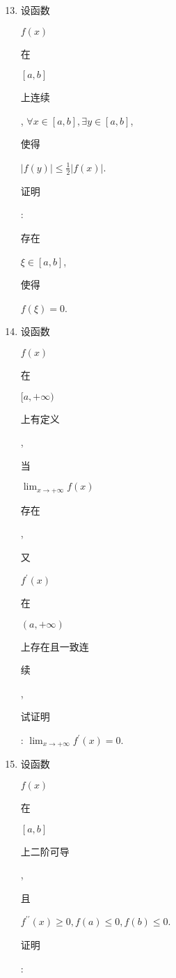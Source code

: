 \documentclass[10pt]{article}
\begin{document}
\begin{enumerate}
  \setcounter{enumi}{12}
  \item \begin{CJK}{UTF8}{mj}设函数\end{CJK} $f(x)$ \begin{CJK}{UTF8}{mj}在\end{CJK} $[a, b]$ \begin{CJK}{UTF8}{mj}上连续\end{CJK}, $\forall x \in[a, b], \exists y \in[a, b]$, \begin{CJK}{UTF8}{mj}使得\end{CJK} $|f(y)| \leqslant \frac{1}{2}|f(x)|$. \begin{CJK}{UTF8}{mj}证明\end{CJK}: \begin{CJK}{UTF8}{mj}存在\end{CJK} $\xi \in[a, b]$, \begin{CJK}{UTF8}{mj}使得\end{CJK} $f(\xi)=0$.

  \item \begin{CJK}{UTF8}{mj}设函数\end{CJK} $f(x)$ \begin{CJK}{UTF8}{mj}在\end{CJK} $[a,+\infty)$ \begin{CJK}{UTF8}{mj}上有定义\end{CJK}, \begin{CJK}{UTF8}{mj}当\end{CJK} $\lim _{x \rightarrow+\infty} f(x)$ \begin{CJK}{UTF8}{mj}存在\end{CJK}, \begin{CJK}{UTF8}{mj}又\end{CJK} $f^{\prime}(x)$ \begin{CJK}{UTF8}{mj}在\end{CJK} $(a,+\infty)$ \begin{CJK}{UTF8}{mj}上存在且一致连\end{CJK} \begin{CJK}{UTF8}{mj}续\end{CJK}, \begin{CJK}{UTF8}{mj}试证明\end{CJK}: $\lim _{x \rightarrow+\infty} f^{\prime}(x)=0$.

  \item \begin{CJK}{UTF8}{mj}设函数\end{CJK} $f(x)$ \begin{CJK}{UTF8}{mj}在\end{CJK} $[a, b]$ \begin{CJK}{UTF8}{mj}上二阶可导\end{CJK}, \begin{CJK}{UTF8}{mj}且\end{CJK} $f^{\prime \prime}(x) \geqslant 0, f(a) \leqslant 0, f(b) \leqslant 0$. \begin{CJK}{UTF8}{mj}证明\end{CJK}:

\end{enumerate}
\end{document}
